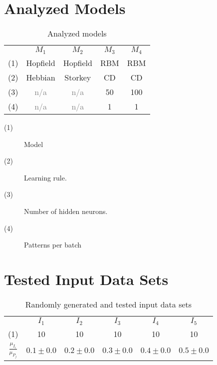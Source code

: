 \documentclass[anon]{CI}
\begin{document}
\section{Analyzed Models}\label{AppB}



\begin{table}[H]
	\centering
	\def\arraystretch{1.5}
	\begin{tabular}{ccccc}
		
		& $M_{1}$  & $M_{2}$  & $M_{3}$  & $M_{4}$  \\ \cline{2-5}
		(1)  & Hopfield  & Hopfield  & RBM  & RBM \\
		(2)  & Hebbian  & Storkey  & CD  & CD \\
		(3)  & \textcolor{gray}{n/a}  & \textcolor{gray}{n/a}  & 50  & 100 \\
		(4)  & \textcolor{gray}{n/a}  & \textcolor{gray}{n/a}  & 1  & 1 
	\end{tabular}
	\caption{Analyzed models}
\end{table}


\begin{description}
	\item [(1)] Model
	\item [(2)] Learning rule.
	\item [(3)] Number of hidden neurons.
	\item [(4)] Patterns per batch
	\end {description}
	
	\section{Tested Input Data Sets}\label{AppC}
	
	
	
	\begin{table}[H]
		\centering
		\def\arraystretch{1.5}
		\begin{tabular}{cccccc}
			
			& $I_{1}$  & $I_{2}$  & $I_{3}$  & $I_{4}$  & $I_{5}$  \\ \cline{2-6}
			(1)  & 10  & 10  & 10  & 10  & 10 \\
			$\frac{\mu_{I_i}}{\mu_{P_j}}$  & $0.1\pm0.0$  & $0.2\pm0.0$  & $0.3\pm0.0$  & $0.4\pm0.0$  & $0.5\pm0.0$ 
		\end{tabular}
		\caption{Randomly generated and tested input data sets}
	\end{table}
	
\end{document}
